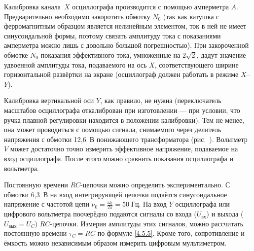 

Калибровка канала~$X$ осциллографа производится с помощью амперметра $A$.
Предварительно необходимо закоротить обмотку $N_0$ (так как катушка с ферромагнитным образцом является
нелинейным элементом, ток в ней не имеет синусоидальной формы,
поэтому связать амплитуду тока с показаниями амперметра можно лишь
с довольно большой погрешностью). При закороченной обмотке $N_0$
показания эффективного тока, умноженные на $2\sqrt{2}$,
дадут значение удвоенной амплитуды тока, подаваемого на ось $X$,
соответствующего ширине горизонтальной развёртки на экране
(осциллограф должен работать в режиме $X$--$Y$).

Калибровка вертикальной оси $Y$, как правило, не нужна
(переключатель масштабов осциллографа откалиброван при изготовлении ---
при условии, что ручка плавной регулировки находится в положении
калибровки).
Тем не менее, она может проводиться с помощью сигнала,
снимаемого через делитель напряжения с обмотки 12,6~В понижающего трансформатора
(рис.~). Вольтметр $V$ может достаточно точно
измерить эффективное напряжение, подаваемое на вход осциллографа. После
этого можно сравнить показания осциллографа и вольтметра.


Постоянную времени $RC$-цепочки можно определить экспериментально.
С обмотки 6,3~В на вход интегрирующей цепочки подаётся синусоидальное напряжение
с частотой цепи $\nu_0=\frac{\omega_0}{2\pi}=50\;Гц$.
На вход $Y$ осциллографа или цифрового вольтметра поочерёдно
подаются сигналы со входа ($U_\text{вх}$) и выхода ($U_\text{вых} = U_C$)
$RC$-цепочки. Измерив амплитуды этих сигналов, можно рассчитать постоянную
времени $\tau_C= RC$ по формуле \eqref{4.5.5}.
Кроме того, сопротивление и ёмкость можно независимым образом измерить
цифровым мультиметром.

